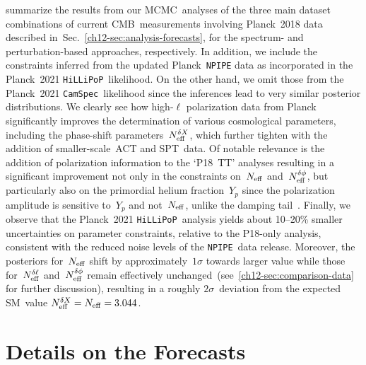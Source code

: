 \begin{subappendices}
\begin{table}
\begin{subtable}{\textwidth}
		\caption[Complete perturbation-based constraints on all cosmological parameters]{$\Lambda\mathrm{CDM} + \Nphase + \Neff + Y_p$}
\end{subtable}
	\caption[Complete perturbation-based constraints on all cosmological parameters]{Same as Table~\ref{ch12-tab:sbt_all}, but for the perturbation-based analyses.}
	\label{ch12-tab:pbt_all}
\end{table}
summarize the results from our MCMC~analyses of the three main dataset combinations of current CMB~measurements involving Planck~2018 data described in~Sec.~\ref{ch12-sec:analysis-forecasts}, for the spectrum- and perturbation-based approaches, respectively. In addition, we include the constraints inferred from the updated Planck~\texttt{NPIPE} data as incorporated in the Planck~2021 \texttt{HiLLiPoP}~likelihood. On the other hand, we omit those from the Planck~2021 \texttt{CamSpec}~likelihood since the inferences lead to very similar posterior distributions. We clearly see how high-$\ell$ polarization data from Planck significantly improves the determination of various cosmological parameters, including the phase-shift parameters~$N_\mathrm{eff}^{\delta X}$, which further tighten with the addition of smaller-scale~ACT and SPT~data. Of notable relevance is the addition of polarization information to the `P18~TT' analyses resulting in a significant improvement not only in the constraints on~$N_\mathrm{eff}$ and~$N_\mathrm{eff}^{\delta\phi}$, but particularly also on the primordial helium fraction~$Y_p$ since the polarization amplitude is sensitive to~$Y_p$ and not~$N_\mathrm{eff}$, unlike the damping tail~\cite{Baumann:2015rya}. Finally, we observe that the Planck~2021 \texttt{HiLLiPoP}~analysis yields about 10--20\% smaller uncertainties on parameter constraints, relative to the P18-only analysis, consistent with the reduced noise levels of the \texttt{NPIPE}~data release. Moreover, the posteriors for~$N_\mathrm{eff}$ shift by approximately~$1\sigma$ towards larger value while those for~$N_\mathrm{eff}^{\delta\ell}$ and~$N_\mathrm{eff}^{\delta\phi}$ remain effectively unchanged~(see~\textsection\ref{ch12-sec:comparison-data} for further discussion), resulting in a roughly $2\sigma$~deviation from the expected SM~value $N_\mathrm{eff}^{\delta X} = N_\mathrm{eff} = 3.044$.





\section{Details on the Forecasts}
\label{ch12-app:forecasts}


\end{subappendices}
